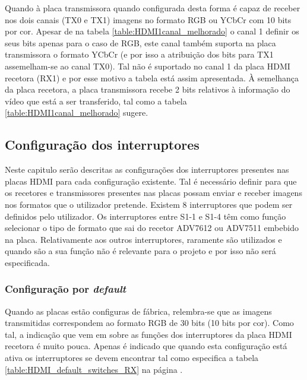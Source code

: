 Quando à placa transmissora quando configurada desta forma é capaz de receber nos dois canais (TX0 e TX1) imagens no formato RGB ou YCbCr com 10 bits por cor. Apesar de na tabela \ref{table:HDMI1canal_melhorado} o canal 1 definir os seus bits apenas para o caso de RGB, este canal também suporta na placa transmissora o formato YCbCr (e por isso a atribuição dos bits para TX1 assemelham-se ao canal TX0). Tal não é suportado no canal 1 da placa HDMI recetora (RX1) e por esse motivo a tabela está assim apresentada. À semelhança da placa recetora, a placa transmissora recebe 2 bits relativos à informação do vídeo que está a ser transferido, tal como a tabela \ref{table:HDMI1canal_melhorado} sugere.

\subsection{Configuração dos interruptores}

Neste capitulo serão descritas as configurações dos interruptores presentes nas placas HDMI para cada configuração existente. Tal é necessário definir para que os recetores e transmissores presentes nas placas possam enviar e receber imagens nos formatos que o utilizador pretende. Existem 8 interruptores que podem ser definidos pelo utilizador. Os interruptores entre S1-1 e S1-4 têm como função selecionar o tipo de formato que sai do recetor ADV7612 ou ADV7511 embebido na placa. Relativamente aos outros interruptores, raramente são utilizados e quando são a sua função não é relevante para o projeto e por isso não será especificada.

\subsubsection{Configuração por \textit{default}} \label{subsubsec:HDMIconfigdefault_switches}

Quando as placas estão configuras de fábrica, relembra-se que as imagens transmitidas correspondem ao formato RGB de 30 bits (10 bits por cor). Como tal, a indicação que vem em \cite{R009} sobre as funções dos interruptores da placa HDMI recetora é muito pouca. Apenas é indicado que quando esta configuração está ativa os interruptores se devem encontrar tal como especifica a tabela \ref{table:HDMI_default_switches_RX} na página \pageref{table:HDMI_default_switches_RX}.

